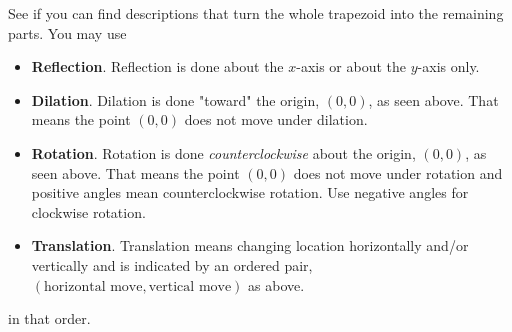 See if you can find descriptions that turn the whole trapezoid into the remaining parts. You may use
\begin{itemize}
    \item \textbf{Reflection}. Reflection is done about the $x$-axis or about the $y$-axis only.
    \item \textbf{Dilation}. Dilation is done "toward" the origin, $(0,0)$, as seen above. That means the point $(0,0)$ does not move under dilation.
    \item \textbf{Rotation}. Rotation is done \textit{counterclockwise} about the origin, $(0,0)$, as seen above. That means the point $(0,0)$ does not move under rotation and positive angles mean counterclockwise rotation. Use negative angles for clockwise rotation.
    \item \textbf{Translation}. Translation means changing location horizontally and/or vertically and is indicated by an ordered pair, $(\text{horizontal move},\text{vertical move})$ as above.
\end{itemize}
in that order. 
